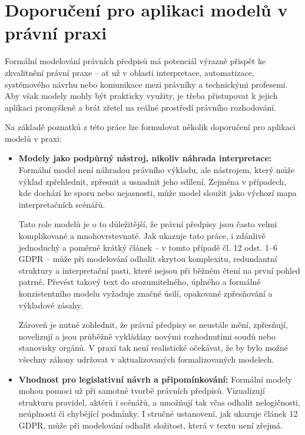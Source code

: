 \section{Doporučení pro aplikaci modelů v právní praxi}
\label{sec:doporuceni-aplikace}

Formální modelování právních předpisů má potenciál výrazně přispět ke zkvalitnění právní praxe – ať už v oblasti interpretace, automatizace, systémového návrhu nebo komunikace mezi právníky a technickými profesemi. Aby však modely mohly být prakticky využity, je třeba přistupovat k jejich aplikaci promyšleně a brát zřetel na reálné prostředí právního rozhodování.

Na základě poznatků z této práce lze formulovat několik doporučení pro aplikaci modelů v praxi:

\begin{itemize}
  \item \textbf{Modely jako podpůrný nástroj, nikoliv náhrada interpretace:} Formální model není náhradou právního výkladu, ale nástrojem, který může výklad zpřehlednit, zpřesnit a usnadnit jeho sdílení. Zejména v případech, kde dochází ke sporu nebo nejasnosti, může model sloužit jako výchozí mapa interpretačních scénářů.

  Tato role modelů je o to důležitější, že právní předpisy jsou často velmi komplikované a mnohovrstevnaté. Jak ukazuje tato práce, i zdánlivě jednoduchý a poměrně krátký článek – v tomto případě čl. 12 odst. 1–6 GDPR – může při modelování odhalit skrytou komplexitu, redundantní struktury a interpretační pasti, které nejsou při běžném čtení na první pohled patrné. Převést takový text do srozumitelného, úplného a formálně konzistentního modelu vyžaduje značné úsilí, opakované zpřesňování a výkladové zásahy.

  Zároveň je nutné zohlednit, že právní předpisy se neustále mění, zpřesňují, novelizují a jsou průběžně vykládány novými rozhodnutími soudů nebo stanovisky orgánů. V praxi tak není realistické očekávat, že by bylo možné všechny zákony udržovat v aktualizovaných formalizovaných modelech.

  \item \textbf{Vhodnost pro legislativní návrh a připomínkování:} Formální modely mohou pomoci už při samotné tvorbě právních předpisů. Vizualizují strukturu pravidel, aktérů i scénářů, a umožňují tak včas odhalit nelogičnosti, neúplnosti či chybějící podmínky. I stručné ustanovení, jak ukazuje článek 12 GDPR, může při modelování odhalit složitost, která v textu není zřejmá.


\end{itemize}
